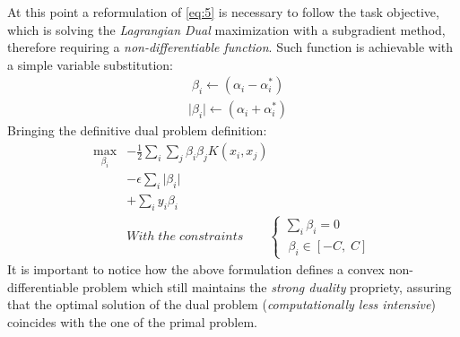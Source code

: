 \documentclass[12pt]{article}
\newcommand{\abs}[1]{\lvert#1\rvert}
\begin{document}
	At this point a reformulation of \eqref{eq:5} is necessary to follow the task objective, which is solving the \textit{Lagrangian Dual} maximization with a subgradient method, therefore requiring a \textit{non-differentiable function}. Such function is achievable with a simple variable substitution:
	\begin{equation*}
	    \begin{aligned}
	    &\;\beta_i \longleftarrow (\alpha_i - \alpha_i^*) \\
	    &\abs{\beta_i} \longleftarrow (\alpha_i + \alpha_i^*)
	    \end{aligned}
	\end{equation*}
	Bringing the definitive dual problem definition:
	\begin{equation}\label{eq:7}
	    \begin{aligned}
	    \max_{\beta_i} &- \frac{1}{2}\sum_i \sum_j \beta_i \beta_j K(x_i,x_j) \\
		&- \epsilon\sum_i\abs{\beta_i}\\
		&+ \sum_i y_i\beta_i\\
		&With\;the\;constraints\qquad
        \begin{cases}
            \sum_i \beta_i = 0 \\
            \;\beta_i\in[-C,\;C] 
        \end{cases}
        \end{aligned}
	\end{equation}
	It is important to notice how the above formulation defines a convex non-differentiable problem which still maintains the \textit{strong duality} propriety, assuring that the optimal solution of the dual problem (\textit{computationally less intensive}) coincides with the one of the primal problem. 





    \pagebreak
\end{document}
